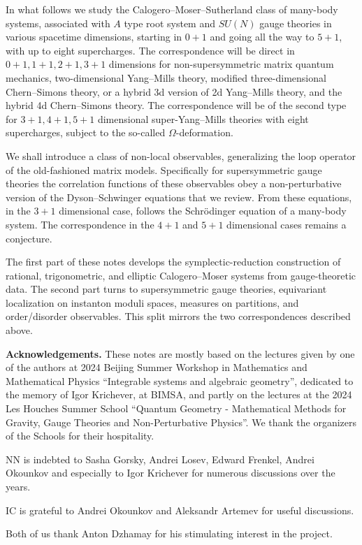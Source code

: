 \documentclass[12pt]{article}
\numberwithin{equation}{section}
\theoremstyle{definition}
\begin{document}
In what follows we study the Calogero--Moser--Sutherland class of
many-body systems, associated with $A$ type root system
and $SU(N)$ gauge theories in various spacetime dimensions, starting in $0+1$ and going all the way to $5+1$, with up to eight supercharges. The correspondence will
be direct in $0+1, 1+1, 2+1, 3+1$ dimensions for non-supersymmetric
matrix quantum mechanics, two-dimensional Yang--Mills
theory, modified three-dimensional Chern--Simons theory, 
or a hybrid 3d version of 2d Yang--Mills theory, and the hybrid
4d Chern--Simons theory. The correspondence will
be of the second type for $3+1, 4+1, 5+1$ dimensional
super-Yang--Mills theories with eight supercharges, subject to
the so-called $\Omega$-deformation. 

We shall introduce a class of non-local observables, 
generalizing the loop operator of the old-fashioned matrix models. Specifically for supersymmetric gauge theories the correlation functions of these observables obey a non-perturbative version of the Dyson--Schwinger equations that we review. From these equations, in the $3+1$ dimensional case, follows the Schr{\"o}dinger equation of a many-body system. The correspondence in the $4+1$ and $5+1$ dimensional cases remains a conjecture. 

The first part of these notes develops the symplectic-reduction construction of rational, trigonometric, and elliptic Calogero--Moser systems from gauge-theoretic data. The second part turns to supersymmetric gauge theories, equivariant localization on instanton moduli spaces, measures on partitions, and order/disorder observables. This split mirrors the two correspondences described above.

{\bf Acknowledgements.} These notes are mostly based on the lectures given by one of the authors at 2024 Beijing Summer Workshop in Mathematics
and Mathematical Physics ``Integrable systems and algebraic geometry'', dedicated to the memory of Igor
Krichever, at BIMSA, and partly on the lectures at the 2024 Les Houches Summer School ``Quantum Geometry - Mathematical Methods for Gravity, Gauge Theories and Non-Perturbative Physics''. We thank the organizers of the Schools for their hospitality.

NN is indebted to Sasha Gorsky, Andrei Losev, Edward Frenkel, Andrei Okounkov and especially to Igor Krichever for numerous discussions over the years. 

IC is grateful to Andrei Okounkov and Aleksandr Artemev for useful discussions.

Both of us thank Anton Dzhamay for his stimulating interest in the project.
\end{document}
